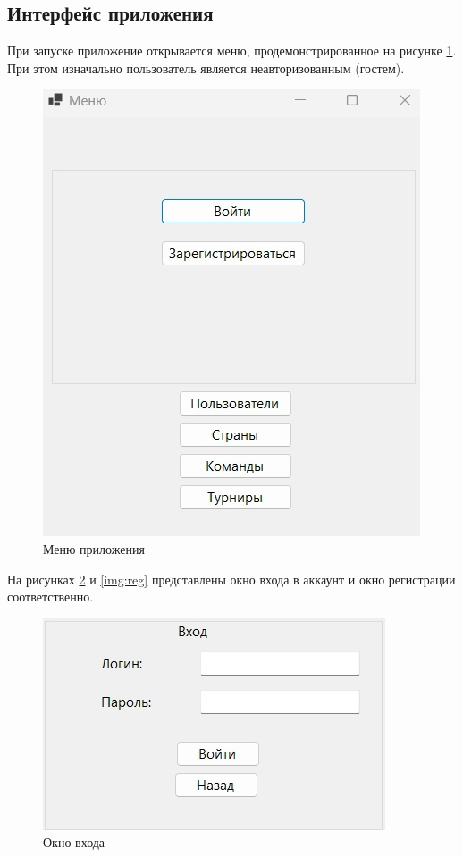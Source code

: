 \subsection{Интерфейс приложения}
При запуске приложение открывается меню, продемонстрированное на рисунке \ref{img:menu}. При этом изначально пользователь является неавторизованным (гостем).
\begin{figure}
  \centering
  \includegraphics[scale=0.5]{inc/menu}
  \caption{Меню приложения}
  \label{img:menu}
\end{figure}
На рисунках \ref{img:login} и \ref{img:reg} представлены окно входа в аккаунт и окно регистрации соответственно.
\begin{figure}
  \centering
  \includegraphics[scale=0.5]{inc/login.jpg}
  \caption{Окно входа}
  \label{img:login}
\end{figure}
